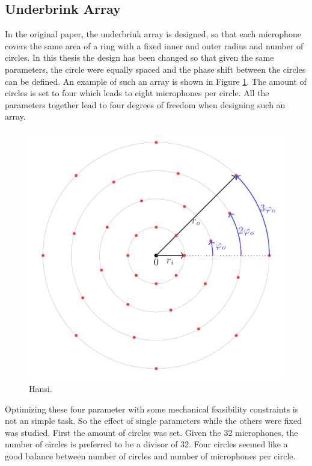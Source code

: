 \subsection{Underbrink Array}
In the original paper, the underbrink array is designed, so that each
microphone covers the same area of a ring with a fixed inner and outer radius and number of circles.
In this thesis the design has been changed so that given the same parameters,
the circle were equally spaced and the phase shift between the circles can be defined.
An example of such an array is shown in Figure \ref*{aev:fig:FancyArr}.
The amount of circles is set to four which leads to eight microphones per circle.
All the parameters together lead to four degrees of freedom when designing such an array.
\begin{figure}
	\centering
	\includegraphics[]{images/5_array_evaluation/fancy_arr.pdf}
	\caption{Hansi.}
	\label{aev:fig:FancyArr}
\end{figure}
Optimizing these four parameter with some mechanical feasibility constraints is not an simple task.
So the effect of single parameters while the others were fixed was studied.
First the amount of circles was set.
Given the 32 microphones, the number of circles is preferred to be a divisor 
of 32.
Four circles seemed like a good balance between number of circles and number of microphones
per circle.

